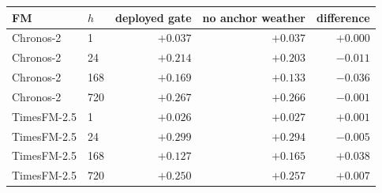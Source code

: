 \begin{tabular}{llrrr}
\toprule
FM & $h$ & deployed gate & no anchor weather & difference \\
\midrule
Chronos-2 & 1 & $+0.037$ & $+0.037$ & $+0.000$ \\
Chronos-2 & 24 & $+0.214$ & $+0.203$ & $-0.011$ \\
Chronos-2 & 168 & $+0.169$ & $+0.133$ & $-0.036$ \\
Chronos-2 & 720 & $+0.267$ & $+0.266$ & $-0.001$ \\
TimesFM-2.5 & 1 & $+0.026$ & $+0.027$ & $+0.001$ \\
TimesFM-2.5 & 24 & $+0.299$ & $+0.294$ & $-0.005$ \\
TimesFM-2.5 & 168 & $+0.127$ & $+0.165$ & $+0.038$ \\
TimesFM-2.5 & 720 & $+0.250$ & $+0.257$ & $+0.007$ \\
\bottomrule
\end{tabular}

